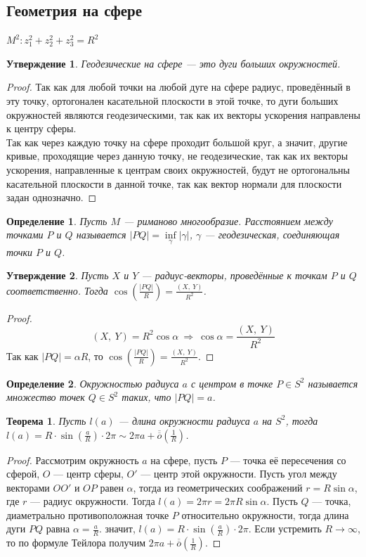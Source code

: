 \documentclass[12pt]{article}
\theoremstyle{plain}
\newtheorem{theorem}{Теорема}[section]
\newtheorem{subtheorem}{Утверждение}[section]
\newtheorem{definition}{Определение}[section]
\begin{document}
    \subsection{Геометрия на сфере}
    $M^2:z_1^2+z_2^2+z_3^2=R^2$
    \begin{subtheorem}
        Геодезические на сфере --- это дуги больших окружностей.
    \end{subtheorem}
    \begin{proof}
        Так как для любой точки на любой дуге на сфере радиус, проведённый в эту точку, ортогонален касательной плоскости в этой точке, то дуги больших окружностей являются геодезическими, так как их векторы ускорения направлены к центру сферы.\\
        Так как через каждую точку на сфере проходит большой круг, а значит, другие кривые, проходящие через данную точку, не геодезические, так как их векторы ускорения, направленные к центрам своих окружностей, будут не ортогональны касательной плоскости в данной точке, так как вектор нормали для плоскости задан однозначно.
    \end{proof}
    \begin{definition}
        Пусть $M$ --- риманово многообразие. Расстоянием между точками $P$ и $Q$ называется $|PQ|=\inf\limits_{\gamma}|\gamma|$, $\gamma$ --- геодезическая, соединяющая точки $P$ и $Q$.
    \end{definition}
    \begin{subtheorem}
        Пусть $X$ и $Y$ --- радиус-векторы, проведённые к точкам $P$ и $Q$ соответственно. Тогда $\cos\left(\frac{|PQ|}{R}\right)=\frac{(X, \ Y)}{R^2}$.
    \end{subtheorem}
    \begin{proof}
        $$(X, \ Y)=R^2\cos\alpha \ \Longrightarrow \ \cos\alpha=\frac{(X, \ Y)}{R^2}$$
        Так как $|PQ|=\alpha R$, то $\cos\left(\frac{|PQ|}{R}\right)=\frac{(X, \ Y)}{R^2}$.
    \end{proof}
    \begin{definition}
        Окружностью радиуса $a$ с центром в точке $P\in S^2$ называется множество точек $Q\in S^2$ таких, что  $|PQ|=a$.
    \end{definition}
    \begin{theorem}
        Пусть $l(a)$ --- длина окружности радиуса $a$ на $S^2$, тогда $l(a)=R\cdot\sin\left(\frac{a}{R}\right)\cdot2\pi\sim 2\pi a+\overline{\overline{o}}\left(\frac{1}{R}\right)$.
    \end{theorem}
    \begin{proof}
        Рассмотрим окружность $a$ на сфере, пусть $P$ --- точка её пересечения со сферой, $O$ --- центр сферы, $O'$ --- центр этой окружности. Пусть угол между векторами $OO'$ и $OP$ равен $\alpha$, тогда из геометрических соображений $r=R\sin\alpha$, где $r$ --- радиус окружности. Тогда $l(a)=2\pi r=2\pi R\sin\alpha$. Пусть $Q$ --- точка, диаметрально противоположная точке $P$ относительно окружности, тогда длина дуги $PQ$ равна $\alpha=\frac{a}{R}$. значит, $l(a)=R\cdot\sin\left(\frac{a}{R}\right)\cdot2\pi$. Если устремить $R\to\infty$, то по формуле Тейлора получим $2\pi a+\overline{\overline{o}}\left(\frac{1}{R}\right)$.
    \end{proof}
\end{document}
